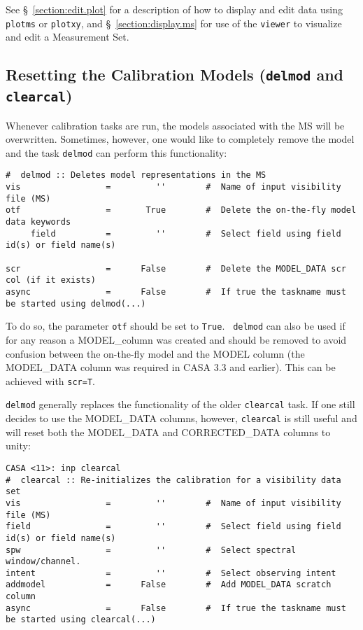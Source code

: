 See \S~\ref{section:edit.plot} for a description of how to display and edit 
data using {\tt plotms} or {\tt plotxy}, and \S~\ref{section:display.ms} for use of
the {\tt viewer} to visualize and edit a Measurement Set.

\subsection{Resetting the Calibration Models ({\tt delmod} and {\tt clearcal})}
\label{section:cal.correct.clearcal}

Whenever calibration tasks are run, the models associated with the MS
will be overwritten. Sometimes, however, one would like to completely
remove the model and the task {\tt delmod} can perform this
functionality:

\small
\begin{verbatim}
#  delmod :: Deletes model representations in the MS
vis                 =         ''        #  Name of input visibility file (MS)
otf                 =       True        #  Delete the on-the-fly model data keywords
     field          =         ''        #  Select field using field id(s) or field name(s)

scr                 =      False        #  Delete the MODEL_DATA scr col (if it exists)
async               =      False        #  If true the taskname must be started using delmod(...)
\end{verbatim} 

To do so, the parameter {\tt otf} should be set to {\tt True}. {\tt
  delmod} can also be used if for any reason a MODEL\_column was
created and should be removed to avoid confusion between the
on-the-fly model and the MODEL column (the MODEL\_DATA column was
required in CASA 3.3 and earlier). This can be achieved with {\tt scr=T}.


{\tt delmod} generally replaces the functionality of the older {\tt clearcal}
task. If one still decides to use the MODEL\_DATA columns, however,
{\tt clearcal} is still useful and will reset both the MODEL\_DATA and
CORRECTED\_DATA columns to unity:

\small
\begin{verbatim}
CASA <11>: inp clearcal
#  clearcal :: Re-initializes the calibration for a visibility data set
vis                 =         ''        #  Name of input visibility file (MS)
field               =         ''        #  Select field using field id(s) or field name(s)
spw                 =         ''        #  Select spectral window/channel.
intent              =         ''        #  Select observing intent
addmodel            =      False        #  Add MODEL_DATA scratch column
async               =      False        #  If true the taskname must be started using clearcal(...)
\end{verbatim}
\normalsize

